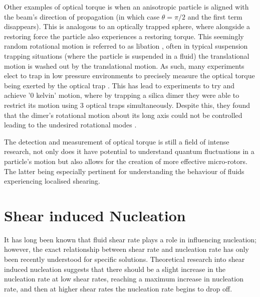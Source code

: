Other examples of optical torque is when an anisotropic particle is 
aligned with the beam's direction of propagation (in which case $\theta
=\pi/2$ and the first term disappears). This is analogous to an optically trapped sphere, where alongside a restoring force the particle also 
experiences a restoring torque. This seemingly random rotational motion
is referred to as libation \cite{Bruce2020}, often in typical suspension
trapping situations (where the particle is suspended in a fluid) the 
translational motion is washed out by the translational motion. As such, 
many experiments elect to trap in low pressure environments to precisely 
measure the optical torque being exerted by the optical trap \cite{Ahn2018}.
This has lead to experiments to try and achieve '0 kelvin' motion, where
by trapping a silica dimer they were able to restrict its motion using 
3 optical traps simultaneously. Despite this, they found that the dimer's
rotational motion about its long axis could not be controlled leading to
the undesired rotational modes \cite{Bang2020}.

The detection and measurement of optical torque is still a field of intense
research, not only does it have potential to understand quantum fluctuations
in a particle's motion but also allows for the creation of more effective
micro-rotors. The latter being especially pertinent for understanding the 
behaviour of fluids experiencing localised shearing.

\section{Shear induced Nucleation}
It has long been known that fluid shear rate plays a role in influencing
nucleation; however, the exact relationship between shear rate and nucleation
rate has only been recently understood for specific solutions. Theoretical research into shear induced nucleation suggests that there should be a 
slight increase in the nucleation rate at low shear rates, reaching a 
maximum increase in nucleation rate, and then at higher shear rates the 
nucleation rate begins to drop off. 

